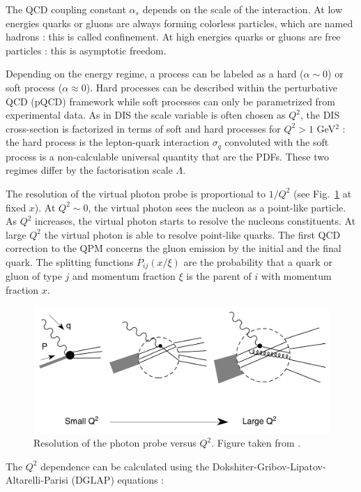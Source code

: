 The QCD coupling constant $\alpha_s$ depends on the scale of the interaction. At low energies quarks or gluons are always forming colorless particles, which are named hadrons : this is called confinement. At high energies quarks or gluons are free particles : this is asymptotic freedom.

Depending on the energy regime, a process can be labeled as a hard ($\alpha \sim 0$) or soft process ($\alpha \approx 0$). Hard processes can be described within the perturbative QCD (pQCD) framework while soft processes can only be parametrized from experimental data. As in DIS the scale variable is often chosen as $Q^2$, the DIS cross-section is factorized \cite{CollinsSoper} in terms of soft and hard processes for $Q^2 > 1$ GeV$^2$ : the hard process is the lepton-quark interaction $\sigma_q$ convoluted with the soft process is a non-calculable universal quantity that are the PDFs. These two regimes differ by the factorisation scale $\Lambda$.

The resolution of the virtual photon probe is proportional to $1/Q^2$ (see Fig.~\ref{pic:Q2res} at fixed $x$). At $Q^2 \sim 0$, the virtual photon sees the nucleon as a point-like particle. As $Q^2$ increases, the virtual photon starts to resolve the nucleons constituents. At large $Q^2$ the virtual photon is able to resolve point-like quarks. The first QCD correction to the QPM concerns the gluon emission by the initial and the final quark. The splitting functions $P_{ij}(x/\xi)$ \cite{Joosten} are the probability that a quark or gluon of type $j$ and momentum fraction $\xi$ is the parent of $i$ with momentum fraction $x$.

\begin{figure}[!h]
  \centering
	\includegraphics[scale=0.6]{./gfx/Q2res.png}
	\caption{Resolution of the photon probe versus $Q^2$. Figure taken from \cite{PICH}.}
	\label{pic:Q2res}
\end{figure}

The $Q^2$ dependence can be calculated using the Dokshiter-Gribov-Lipatov-Altarelli-Parisi (DGLAP) equations \cite{Dokshitser, GL1, GL2, AP} :

